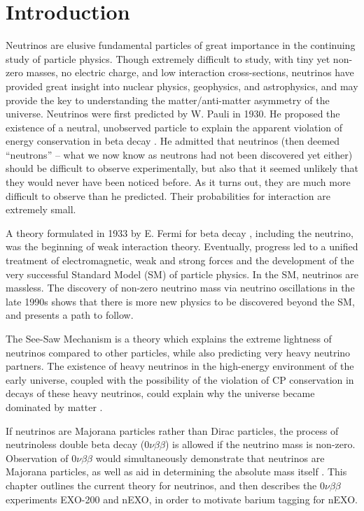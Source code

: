 \chapter{Introduction}

Neutrinos are elusive fundamental particles of great importance in the continuing study of particle physics.  Though extremely difficult to study, with tiny yet non-zero masses, no electric charge, and low interaction cross-sections, neutrinos have provided great insight into nuclear physics, geophysics, and astrophysics, and may provide the key to understanding the matter/anti-matter asymmetry of the universe.  Neutrinos were first predicted by W. Pauli in 1930.  He proposed the existence of a neutral, unobserved particle to explain the apparent violation of energy conservation in beta decay \cite{betaspectrum}. He admitted that neutrinos (then deemed ``neutrons'' -- what we now know as neutrons had not been discovered yet either) should be difficult to observe experimentally, but also that it seemed unlikely that they would never have been noticed before.  As it turns out, they are much more difficult to observe than he predicted.  Their probabilities for interaction are extremely small.

A theory formulated in 1933 by E. Fermi for beta decay \cite{FermiBetaDecay}, including the neutrino, was the beginning of weak interaction theory.  Eventually, progress led to a unified treatment of electromagnetic, weak and strong forces and the development of the very successful Standard Model (SM) of particle physics.  In the SM, neutrinos are massless.  The discovery of non-zero neutrino mass via neutrino oscillations in the late 1990s \cite{SuperK} shows that there is more new physics to be discovered beyond the SM, and presents a path to follow.

The See-Saw Mechanism is a theory which explains the extreme lightness of neutrinos compared to other particles, while also predicting very heavy neutrino partners.  The existence of heavy neutrinos in the high-energy environment of the early universe, coupled with the possibility of the violation of CP conservation in decays of these heavy neutrinos, could explain why the universe became dominated by matter \cite{SeeSaw}.

If neutrinos are Majorana particles rather than Dirac particles, the process of neutrinoless double beta decay ($0\nu\beta\beta$) is allowed if the neutrino mass is non-zero.  Observation of $0\nu\beta\beta$ would simultaneously demonstrate that neutrinos are Majorana particles, as well as aid in determining the absolute mass itself \cite{effectiveMass}.  This chapter outlines the current theory for neutrinos, and then describes the $0\nu\beta\beta$ experiments EXO-200 and nEXO, in order to motivate barium tagging for nEXO.


